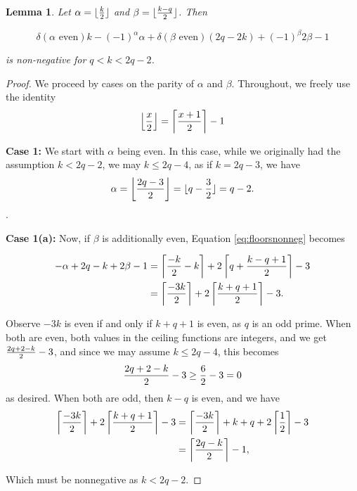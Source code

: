 \documentclass[11pt]{amsart}
\numberwithin{equation}{section}
\theoremstyle{plain}
\newtheorem{lemma}[equation]{Lemma}
\theoremstyle{definition}
\begin{document}
\begin{lemma}\label{lem:q01_p2_comp}
Let $\alpha=\lfloor {k\over 2}\rfloor$ and $\beta=\lfloor{k-q\over 2}\rfloor$. Then 

\begin{equation}\label{eq:floorsnonneg}
\delta(\alpha \text{ even}) k -(-1)^{\alpha}\alpha +\delta(\beta \text{ even})(2q-2k)+(-1)^\beta 2\beta -1
\end{equation}

is non-negative for $q<k<2q-2$.
\end{lemma}
\begin{proof}

We proceed by cases on the parity of $\alpha$ and $\beta$. Throughout, we freely use the identity \[\left\lfloor{x\over 2}\right\rfloor=\left\lceil {x+1\over 2}\right\rceil-1\]

\noindent\textbf{Case 1:}
We start with $\alpha$ being even. In this case, while we originally had the assumption $k<2q-2$, we may  $k\leq 2q-4$, as if $k=2q-3$, we have 
\[\alpha=\left\lfloor {2q-3\over 2}\right\rfloor=\lfloor q-{3\over 2}\rfloor=q-2.\].

\noindent \textbf{Case 1(a):}
Now, if  $\beta$ is additionally even, Equation \ref{eq:floorsnonneg} becomes

\begin{align*}
-\alpha+2q-k+2\beta-1&=\left\lceil{-k\over 2}-k \right\rceil+ 2\left\lceil q+{k-q+1\over 2}\right\rceil-3\\
&=\left\lceil{-3k\over 2} \right\rceil+ 2\left\lceil {k+q+1\over 2}\right\rceil-3.
\end{align*}

Observe $-3k$ is even if and only if $k+q+1$ is even, as $q$ is an odd prime. When both are even, both values in the ceiling functions are integers, and we get ${2q+2-k\over 2}-3$, and since we may assume $k\leq 2q-4$, this becomes
\[{2q+2-k\over 2}-3\geq {6\over 2}-3=0\]
as desired. When both are odd, then $k-q$ is even, and we have
\begin{align*}
\left\lceil{-3k\over 2} \right\rceil+ 2\left\lceil {k+q+1\over 2}\right\rceil-3&=
\left\lceil{-3k\over 2} \right\rceil+ k+q+2\left\lceil {1\over 2}\right\rceil-3\\
&=
\left\lceil{2q-k\over 2} \right\rceil-1,
\end{align*}

Which must be nonnegative as $k<2q-2$. 


\end{proof}
\end{document}

